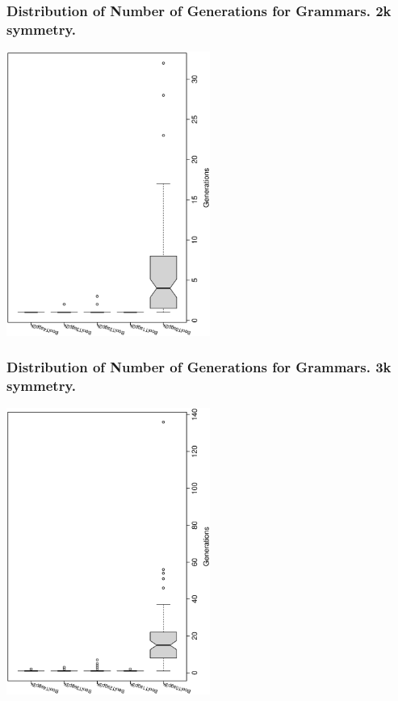 \documentclass[18pt,c]{beamer}
\begin{document}
 \begin{frame}
 \frametitle{ Distribution of Number of Generations for Grammars. 2k  symmetry. }
 \begin{center}
\includegraphics[width=0.5\textwidth, angle=-90]
{ExpBboxplottGenerations000.eps}
 \end{center}
 \label{ExpBboxplottGenerations000.eps}  
 \end{frame}

 \begin{frame}
 \frametitle{ Distribution of Number of Generations for Grammars. 3k  symmetry. }
 \begin{center}
\includegraphics[width=0.5\textwidth, angle=-90]
{ExpBboxplottGenerations001.eps}
 \end{center}
 \label{ExpBboxplottGenerations001.eps}  
 \end{frame}
\end{document}
